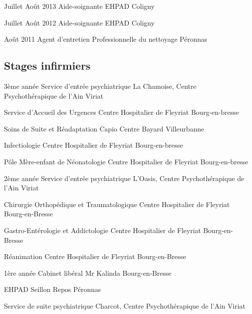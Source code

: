 \documentclass[10pt,a4paper]{moderncv}
\begin{document}
\cventry
	{Juillet Août 2013}
	{Aide-soignante}
	{EHPAD}
	{Coligny}
	{}
	{}

\cventry
    {Juillet Août 2012}
	{Aide-soignante}
	{EHPAD}
	{Coligny}
	{}
	{}

\cventry
	{Août 2011}
	{Agent d'entretien}
	{Professionnelle du nettoyage}
	{Péronnas}
	{}
	{}

\vspace*{3mm}

\subsection{Stages infirmiers}
	
\cventry
	{3ème année}
	{Service d'entrée psychiatrique}
	{La Chamoise, Centre Psychothérapique de l’Ain}
	{Viriat}
	{}
	{}

\cventry
	{}
	{Service d’Accueil des Urgences}
	{Centre Hospitalier de Fleyriat}
	{Bourg-en-bresse}
	{}
	{}

\cventry
	{}
	{Soins de Suite et Réadaptation}
	{Capio Centre Bayard}
	{Villeurbanne}
	{}
	{}

\cventry
	{}
	{Infectiologie}
	{Centre Hospitalier de Fleyriat}
	{Bourg-en-bresse}
	{}
	{}

\cventry
	{}
	{Pôle Mère-enfant de Néonatologie}
	{Centre Hospitalier de Fleyriat}
	{Bourg-en-bresse}
	{}
	{}

\vspace*{3mm}

\cventry
	{2ème année}
	{Service d’entrée psychiatrique}
	{L'Oasis, Centre Psychothérapique de l’Ain}
	{Viriat}
	{}
	{}

\cventry
	{}
	{Chirurgie Orthopédique et Traumatologique}
	{Centre Hospitalier de Fleyriat}
	{Bourg-en-Bresse}
	{}
	{}

\cventry
	{}
	{Gastro-Entérologie et Addictologie}
    {Centre Hospitalier de Fleyriat}
	{Bourg-en-Bresse}
	{}
	{}

\cventry
	{}
	{Réanimation}
	{Centre Hospitalier de Fleyriat}
	{Bourg-en-Bresse}
	{}
	{}

\vspace*{3mm}

\cventry
	{1ère année}
	{Cabinet libéral}
	{Mr Kalinda}
	{Bourg-en-Bresse}
	{}
	{}

\cventry
	{}
	{EHPAD}
	{Seillon Repos}
	{Péronnas}
	{}
	{}

\cventry
	{}
	{Service de suite psychiatrique}
	{Charcot, Centre Psychothérapique de l’Ain}
	{Viriat}
	{}
	{}
\end{document}
